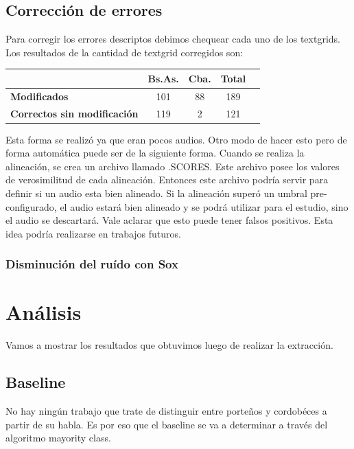 \documentclass[11pt,a4paper,twoside]{tesis}
\begin{document}
\section{Corrección de errores}

Para corregir los errores descriptos debimos chequear cada uno de los textgrids. Los resultados de la cantidad de textgrid corregidos son:

\begin{table}[h]
\centering
\begin{tabular}{|l|c|c|c|c|}
\hline
\textbf{}  & \textbf{Bs.As. } & \textbf{Cba.} & \textbf{Total} \\ \hline
\textbf{Modificados}  & 101 & 88 & 189 \\ \hline
\textbf{Correctos sin modificación}  & 119 & 2 & 121 \\ \hline
\end{tabular}
\end{table}

Esta forma se realizó ya que eran pocos audios. Otro modo de hacer esto pero de forma automática puede ser de la siguiente forma. Cuando se realiza la alineación, se crea un archivo llamado .SCORES. Este archivo posee los valores de verosimilitud de cada alineación. Entonces este archivo podría servir para definir si un audio esta bien alineado. Si la alineación superó un umbral pre-configurado, el audio estará bien alineado y se podrá utilizar para el estudio, sino el audio se descartará. Vale aclarar que esto puede tener falsos positivos. Esta idea podría realizarse en trabajos futuros.

\subsection{Disminución del ruído con Sox}

\chapter{Análisis}

Vamos a mostrar los resultados que obtuvimos luego de realizar la extracción.

\section{Baseline}

No hay ningún trabajo que trate de distinguir entre porteños y cordobéces a partir de su habla. Es por eso que el baseline se va a determinar a través del algoritmo mayority class.
\end{document}
